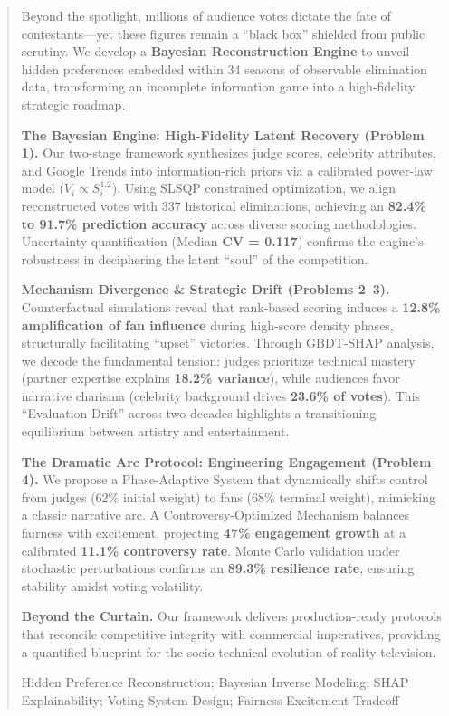 \begin{abstract}

Beyond the spotlight, millions of audience votes dictate the fate of contestants---yet these figures remain a ``black box'' shielded from public scrutiny. We develop a \textbf{Bayesian Reconstruction Engine} to unveil hidden preferences embedded within 34 seasons of observable elimination data, transforming an incomplete information game into a high-fidelity strategic roadmap.

\textbf{The Bayesian Engine: High-Fidelity Latent Recovery (Problem 1).} Our two-stage framework synthesizes judge scores, celebrity attributes, and Google Trends into information-rich priors via a calibrated power-law model ($V_i \propto S_i^{1.2}$). Using SLSQP constrained optimization, we align reconstructed votes with 337 historical eliminations, achieving an \textbf{82.4\% to 91.7\% prediction accuracy} across diverse scoring methodologies. Uncertainty quantification (Median \textbf{CV = 0.117}) confirms the engine's robustness in deciphering the latent ``soul'' of the competition.

\textbf{Mechanism Divergence \& Strategic Drift (Problems 2--3).} Counterfactual simulations reveal that rank-based scoring induces a \textbf{12.8\% amplification of fan influence} during high-score density phases, structurally facilitating ``upset'' victories. Through GBDT-SHAP analysis, we decode the fundamental tension: judges prioritize technical mastery (partner expertise explains \textbf{18.2\% variance}), while audiences favor narrative charisma (celebrity background drives \textbf{23.6\% of votes}). This ``Evaluation Drift'' across two decades highlights a transitioning equilibrium between artistry and entertainment.

\textbf{The Dramatic Arc Protocol: Engineering Engagement (Problem 4).} We propose a Phase-Adaptive System that dynamically shifts control from judges (62\% initial weight) to fans (68\% terminal weight), mimicking a classic narrative arc. A Controversy-Optimized Mechanism balances fairness with excitement, projecting \textbf{47\% engagement growth} at a calibrated \textbf{11.1\% controversy rate}. Monte Carlo validation under stochastic perturbations confirms an \textbf{89.3\% resilience rate}, ensuring stability amidst voting volatility.

\textbf{Beyond the Curtain.} Our framework delivers production-ready protocols that reconcile competitive integrity with commercial imperatives, providing a quantified blueprint for the socio-technical evolution of reality television.

\begin{keywords}
Hidden Preference Reconstruction; Bayesian Inverse Modeling; SHAP Explainability; Voting System Design; Fairness-Excitement Tradeoff
\end{keywords}

\end{abstract}

